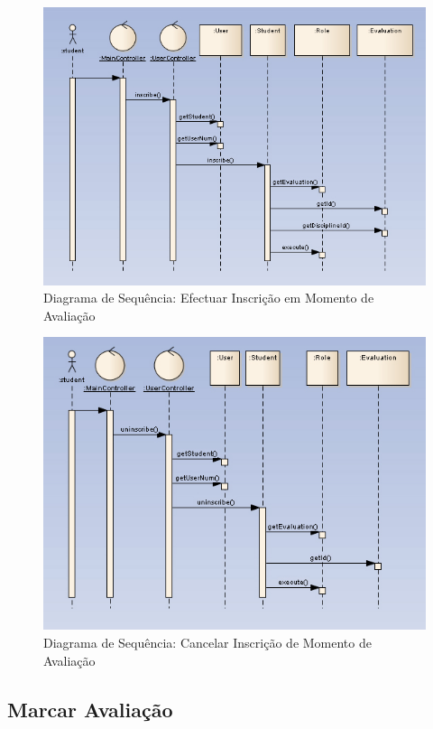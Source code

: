\begin{figure}[!htbp]
\centering
\includegraphics{imagens/inscrever_avaliacao.jpg}
\caption{Diagrama de Sequência: Efectuar Inscrição em Momento de Avaliação}
\label{fig:inscrever_avaliacao}
\end{figure}

\begin{figure}[!htbp]
\centering
\includegraphics{imagens/cancelar_inscricao.jpg}
\caption{Diagrama de Sequência: Cancelar Inscrição de Momento de Avaliação}
\label{fig:cancelar_inscricao}
\end{figure}





\clearpage
\subsection{Marcar Avaliação}

